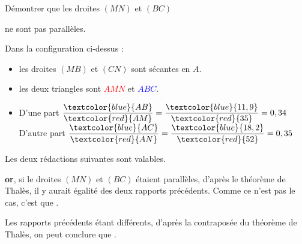 \begin{methode*1}
\begin{minipage}{8cm}
                Démontrer que les droites $(MN)$ et $(BC)$ 
                
                ne sont pas parallèles.
            \end{minipage}
            
            \correction
            Dans la configuration ci-dessus : 
            \begin{itemize}
                \item les droites $(MB)$ et $(CN)$ sont sécantes en $A$.                
                \item les deux triangles sont \textcolor{red}{$AMN$} et \textcolor{blue}{$ABC$}.            
                \item D'une part $\dfrac{\textcolor{blue}{AB}}{\textcolor{red}{AM}} = \dfrac{\textcolor{blue}{11,9}}{\textcolor{red}{35}}=0,34$
                \hfill
                D'autre part $\dfrac{\textcolor{blue}{AC}}{\textcolor{red}{AN}} = \dfrac{\textcolor{blue}{18,2}}{\textcolor{red}{52}}=0,35$
            \end{itemize}

            \begin{remarque}
                Les deux rédactions suivantes sont valables.
            \end{remarque}
            
            \hspace*{0.5cm}

            \begin{minipage}{8cm}
                \textbf{or}, si le droites $(MN)$ et $(BC)$ étaient parallèles, d'après le théorème de Thalès, il y aurait égalité des deux rapports
                précédents. Comme ce n'est pas le cas, c'est que .
    
            \end{minipage}
            \hspace*{0.5cm}
            \vrule
            \hspace*{0.5cm}
            \begin{minipage}{8cm}
                Les rapports précédents étant différents, d'après la contraposée du théorème de Thalès, on peut conclure que .
            \end{minipage}
        \end{methode*1}

